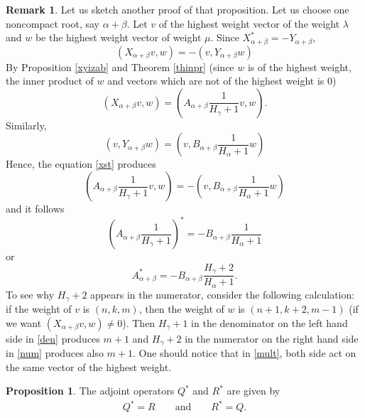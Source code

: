 \documentclass[twoside,a4paper,12pt]{article}
\theoremstyle{definition}
\newtheorem{remark}{Remark}
\newtheorem{proposition}{Proposition}
\begin{document}
\begin{remark}
	Let us sketch another proof of that proposition.
	Let us choose one noncompact root, say $\alpha+\beta$.
	Let $v$ of the highest weight vector of the weight $\lambda$ and $w$ be
	the highest weight vector of weight $\mu$.
	Since $X_{\alpha+\beta}^*=-Y_{\alpha+\beta}$,
	\begin{equation}\label{xst}
		(X_{\alpha+\beta}v,w)=-(v,Y_{\alpha+\beta}w)
	\end{equation}
	By Proposition \ref{xyizab} and Theorem \ref{thinpr} (since $w$ is of
	the highest weight, the inner product of $w$ and vectors which are not of
	the highest weight is 0)
	\begin{equation*}
		(X_{\alpha+\beta}v,w)=
		\left(A_{\alpha+\beta}\frac1{H_\gamma+1}v,w\right).
	\end{equation*}
	Similarly,
	\begin{equation*}
		(v,Y_{\alpha+\beta}w)=\left(v,B_{\alpha+\beta}\frac1{H_\alpha+1}w\right)
	\end{equation*}
	Hence, the equation \eqref{xst} produces
	\begin{equation*}
		\left(A_{\alpha+\beta}\frac1{H_\gamma+1}v,w\right)=
		-\left(v,B_{\alpha+\beta}\frac1{H_\alpha+1}w\right)
	\end{equation*}
	and it follows
	\begin{equation}\label{den}
		\left(A_{\alpha+\beta}\frac1{H_\gamma+1}\right)^*=
		-B_{\alpha+\beta}\frac1{H_\alpha+1}
	\end{equation}
	or
	\begin{equation}\label{num}
		A_{\alpha+\beta}^*=-B_{\alpha+\beta}\frac{H_\gamma+2}{H_\alpha+1}.
	\end{equation}
	To see why $H_\gamma+2$ appears in the numerator, consider the following
	calculation: if the weight of $v$ is $(n,k,m)$, then the weight of
	$w$ is $(n+1,k+2,m-1)$ (if we want $(X_{\alpha+\beta}v,w)\neq0$). Then
	$H_\gamma+1$ in the denominator on the left hand side in \eqref{den}
	produces $m+1$ and $H_\gamma+2$ in the numerator on the right hand side in
	\eqref{num} produces also $m+1$. One should notice that in \eqref{mult},
	both side act on the same vector of the highest weight.
\end{remark}

\begin{proposition}
	The adjoint operators $Q^*$ and $R^*$ are given by
	\begin{eqnarray}\label{qrstar}
		Q^*=R\qquad\mbox{and}\qquad R^*=Q.
	\end{eqnarray}
\end{proposition}
\end{document}
